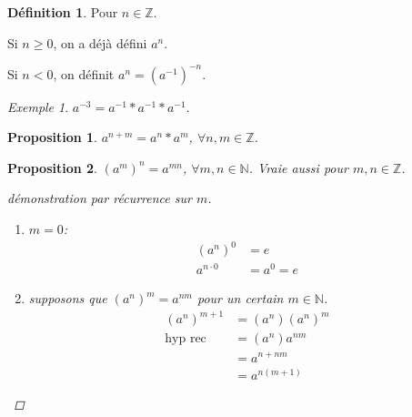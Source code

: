 \documentclass{report}
\newtheorem*{prop}{Proposition}
\theoremstyle{definition}
\newtheorem*{defin}{D\'efinition}
\theoremstyle{remark}
\newtheorem*{exem}{Exemple}
\begin{document}
	\begin{defin}
		Pour $n \in \mathbb{Z}$.

		Si $n \geq 0$, on a d\'ej\`a d\'efini $a^n$.

		Si $n<0$, on d\'efinit $a^n=(a^{-1})^{-n}$.
	\end{defin}
	\begin{exem}
		$a^{-3}=a^{-1}*a^{-1}*a^{-1}$.
	\end{exem}
	\begin{prop}
		$a^{n+m}=a^n*a^m$, $\forall n,m \in \mathbb{Z}$.
	\end{prop}
	\begin{prop}
		$(a^m)^n=a^{mn}$, $\forall m,n \in \mathbb{N}$. Vraie aussi pour $m,n \in \mathbb{Z}$.
		\begin{proof}[d\'emonstration par r\'ecurrence sur $m$]~

		\begin{enumerate}
			\item $m=0$:
			\begin{align*}
				(a^n)^0&= e\\
				a^{n \cdot 0}&= a^0=e
			\end{align*}
			\item supposons que $(a^n)^m=a^{nm}$ pour un certain $m \in \mathbb{N}$.
			\begin{align*}
				(a^n)^{m+1}&= (a^n)(a^n)^m\\
				\text{hyp rec}&= (a^n)a^{nm}\\
				&= a^{n+nm}\\
				&= a^{n(m+1)}
			\end{align*}
		\end{enumerate}
		\end{proof}
	\end{prop}
\end{document}
